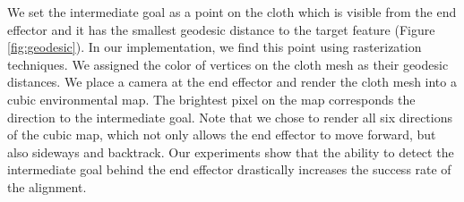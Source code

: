 We set the intermediate goal as a point on the cloth which is visible from the end effector and it has the smallest geodesic distance to the target feature (Figure \ref{fig:geodesic}). In our implementation, we find this point using rasterization techniques. We assigned the color of vertices on the cloth mesh as their geodesic distances. We place a camera at the end effector and render the cloth mesh into a cubic environmental map. The brightest pixel on the map corresponds the direction to the intermediate goal. Note that we chose to render all six directions of the cubic map, which not only allows the end effector to move forward, but also sideways and backtrack. Our experiments show that the ability to detect the intermediate goal behind the end effector drastically increases the success rate of the alignment.

